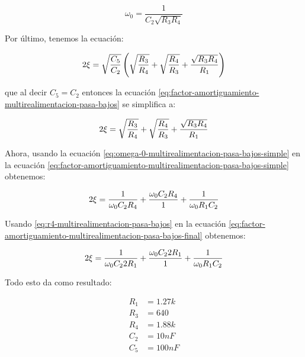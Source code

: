 \begin{equation}
    \omega_0 = \frac{1}{C_2\sqrt{R_3 R_4}}
    \label{eq:omega-0-multirealimentacion-pasa-bajos-simple}
\end{equation}

Por último, tenemos la ecuación:

\begin{equation}
    2\xi = \sqrt{\frac{C_5}{C_2}} \left( \sqrt{\frac{R_3}{R_4}} + \sqrt{\frac{R_4}{R_3}} + \frac{\sqrt{R_3 R_4}}{R_1} \right)
    \label{eq:factor-amortiguamiento-multirealimentacion-pasa-bajos}
\end{equation}


que al decir $C_5 = C_2$ entonces la ecuación \ref{eq:factor-amortiguamiento-multirealimentacion-pasa-bajos} se simplifica a:

\begin{equation}
    2\xi = \sqrt{\frac{R_3}{R_4}} + \sqrt{\frac{R_4}{R_3}} + \frac{\sqrt{R_3 R_4}}{R_1} 
    \label{eq:factor-amortiguamiento-multirealimentacion-pasa-bajos-simple}
\end{equation}

Ahora, usando la ecuación \ref{eq:omega-0-multirealimentacion-pasa-bajos-simple} en la ecuación \ref{eq:factor-amortiguamiento-multirealimentacion-pasa-bajos-simple} obtenemos:

\begin{equation}
    2\xi = \frac{1}{\omega_0 C_2 R_4} + \frac{\omega_0 C_2 R_4}{1} + \frac{1}{\omega_0 R_1 C_2} 
    \label{eq:factor-amortiguamiento-multirealimentacion-pasa-bajos-final}
\end{equation}

Usando \ref{eq:r4-multirealimentacion-pasa-bajos} en la ecuación \ref{eq:factor-amortiguamiento-multirealimentacion-pasa-bajos-final} obtenemos:

\begin{equation}
    2\xi = \frac{1}{\omega_0 C_2 2R_1} + \frac{\omega_0 C_2 2R_1}{1} + \frac{1}{\omega_0 R_1 C_2} 
    \label{eq:factor-amortiguamiento-multirealimentacion-pasa-bajos-final-final}
\end{equation}

Todo esto da como resultado:

\begin{align*}
    R_1 &= 1.27k \\
    R_3 &= 640 \\
    R_4 &= 1.88k \\
    C_2 &= 10nF \\
    C_5 &= 100nF \\
\end{align*}

